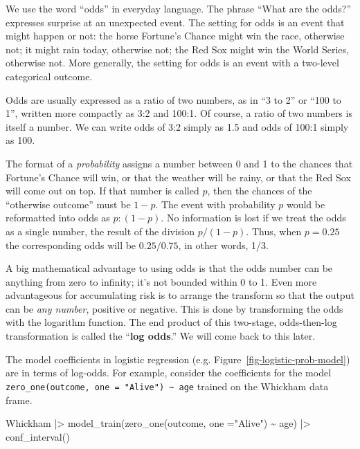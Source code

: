 \documentclass[
  letterpaper,
  DIV=11,
  numbers=noendperiod,
  oneside]{scrartcl}
\newenvironment{Shaded}{\begin{snugshade}}{\end{snugshade}}
\newcommand{\AttributeTok}[1]{\textcolor[rgb]{0.40,0.45,0.13}{#1}}
\newcommand{\FunctionTok}[1]{\textcolor[rgb]{0.28,0.35,0.67}{#1}}
\newcommand{\NormalTok}[1]{\textcolor[rgb]{0.00,0.23,0.31}{#1}}
\newcommand{\SpecialCharTok}[1]{\textcolor[rgb]{0.37,0.37,0.37}{#1}}
\newcommand{\StringTok}[1]{\textcolor[rgb]{0.13,0.47,0.30}{#1}}
\begin{document}
We use the word ``odds'' in everyday language. The phrase ``What are the
odds?'' expresses surprise at an unexpected event. The setting for odds
is an event that might happen or not: the horse Fortune's Chance might
win the race, otherwise not; it might rain today, otherwise not; the Red
Sox might win the World Series, otherwise not. More generally, the
setting for odds is an event with a two-level categorical outcome.

Odds are usually expressed as a ratio of two numbers, as in ``3 to 2''
or ``100 to 1'', written more compactly as 3:2 and 100:1. Of course, a
ratio of two numbers is itself a number. We can write odds of 3:2 simply
as 1.5 and odds of 100:1 simply as 100.

The format of a \emph{probability} assigns a number between 0 and 1 to
the chances that Fortune's Chance will win, or that the weather will be
rainy, or that the Red Sox will come out on top. If that number is
called \(p\), then the chances of the ``otherwise outcome'' must be
\(1-p\). The event with probability \(p\) would be reformatted into odds
as \(p:(1-p)\). No information is lost if we treat the odds as a single
number, the result of the division \(p/(1-p)\). Thus, when \(p=0.25\)
the corresponding odds will be \(0.25/0.75\), in other words, 1/3.

A big mathematical advantage to using odds is that the odds number can
be anything from zero to infinity; it's not bounded within 0 to 1. Even
more advantageous for accumulating risk is to arrange the transform so
that the output can be \emph{any number}, positive or negative. This is
done by transforming the odds with the logarithm function. The end
product of this two-stage, odds-then-log transformation is called the
``\textbf{log odds}.'' We will come back to this later.

The model coefficients in logistic regression (e.g.
Figure~\ref{fig-logistic-prob-model}) are in terms of log-odds. For
example, consider the coefficients for the model
\texttt{zero\_one(outcome,\ one\ =\ "Alive")\ \textasciitilde{}\ age}
trained on the Whickham data frame.

\begin{Shaded}
\begin{Highlighting}[]
\NormalTok{Whickham }\SpecialCharTok{|\textgreater{}} 
  \FunctionTok{model\_train}\NormalTok{(}\FunctionTok{zero\_one}\NormalTok{(outcome, }\AttributeTok{one =}\StringTok{"Alive"}\NormalTok{) }\SpecialCharTok{\textasciitilde{}}\NormalTok{ age) }\SpecialCharTok{|\textgreater{}}
  \FunctionTok{conf\_interval}\NormalTok{()}
\end{Highlighting}
\end{Shaded}
\end{document}
